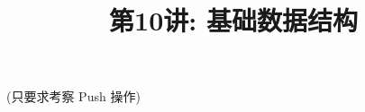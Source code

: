 \documentclass[a4paper, justified]{tufte-handout}
\title{第10讲: 基础数据结构}
\date{\zhtoday} %
\begin{document}
\maketitle
\noplagiarism %
\begin{abstract}
\end{abstract}
\beginrequired

\begin{problem}[MA 2.6]
  (只要求考察 Push 操作)
\end{problem}

\begin{solution}
\end{solution}


\begin{problem}[TC 10.1-4]
\end{problem}

\begin{solution}
\end{solution}

\begin{problem}[TC 10.1-6]
\end{problem}

\begin{solution}
\end{solution}

\begin{problem}[TC 10.2-6]
\end{problem}

\begin{solution}
\end{solution}

\begin{problem}[TC 10.3-4]
\end{problem}

\begin{solution}
\end{solution}

\begin{problem}[TC 10.3-5]
\end{problem}
\end{document}

